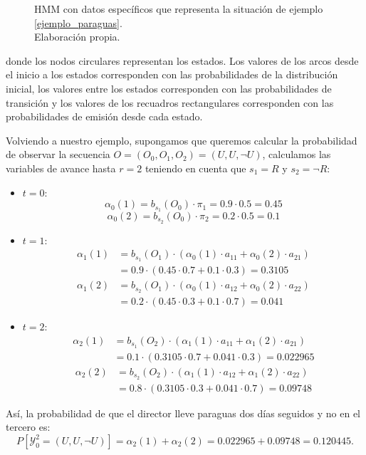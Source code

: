 \begin{exampleth}
\begin{figure}[H]

\caption{HMM con datos específicos que representa la situación de ejemplo \ref{ejemplo_paraguas}.\\ Elaboración propia.}
\end{figure}

donde los nodos circulares representan los estados. Los valores de los arcos desde el inicio a los estados corresponden con las probabilidades de la distribución inicial, los valores entre los estados corresponden con las probabilidades de transición y los valores de los recuadros rectangulares corresponden con las probabilidades de emisión desde cada estado.

Volviendo a nuestro ejemplo, supongamos que queremos calcular la probabilidad de observar la secuencia $O=(O_0,O_1,O_2)=(U,U,\neg U)$, calculamos las variables de avance hasta $r=2$ teniendo en cuenta que $s_1=R$ y $s_2=\neg R$:
\begin{itemize}
    \item $t=0$:
    \[\alpha_0(1)=b_{s_1}(O_0)\cdot\pi_1=0.9\cdot0.5=0.45\]
    \[\alpha_0(2)=b_{s_2}(O_0)\cdot\pi_2=0.2\cdot0.5=0.1\]
    \item $t=1$:
    \[
    \begin{aligned}
        \alpha_1(1)&=b_{s_1}(O_1)\cdot\left(\alpha_0(1)\cdot a_{11}+\alpha_0(2)\cdot a_{21} \right)\\
        &=0.9\cdot\left( 0.45\cdot0.7+0.1\cdot0.3 \right) = 0.3105
    \end{aligned}
    \]
    \[
    \begin{aligned}
        \alpha_1(2)&=b_{s_2}(O_1)\cdot\left(\alpha_0(1)\cdot a_{12}+\alpha_0(2)\cdot a_{22} \right)\\
        &=0.2\cdot\left(0.45\cdot0.3+0.1\cdot0.7\right)=0.041
    \end{aligned}
    \]
    \item $t=2$:
    \[
    \begin{aligned}
        \alpha_2(1)&=b_{s_1}(O_2)\cdot\left(\alpha_1(1)\cdot a_{11}+\alpha_1(2)\cdot a_{21} \right)\\
        &=0.1\cdot\left( 0.3105\cdot0.7+0.041\cdot0.3 \right) = 0.022965
    \end{aligned}
    \]
    \[
    \begin{aligned}
        \alpha_2(2)&=b_{s_2}(O_2)\cdot\left(\alpha_1(1)\cdot a_{12}+\alpha_1(2)\cdot a_{22} \right)\\
        &=0.8\cdot\left(0.3105\cdot0.3+0.041\cdot0.7\right)=0.09748
    \end{aligned}
    \]
\end{itemize}
Así, la probabilidad de que el director lleve paraguas dos días seguidos y no en el tercero es:
\[P[\mathcal{Y}_0^2=(U,U,\neg U)]=\alpha_2(1)+\alpha_2(2)=0.022965+0.09748=0.120445.\]
\end{exampleth}

